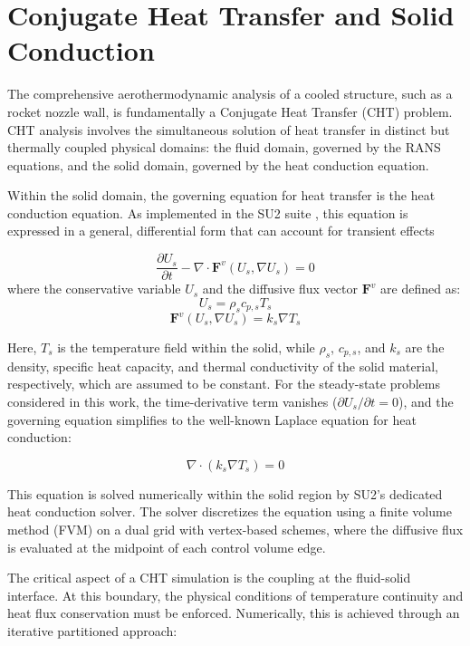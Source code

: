 \documentclass[tg, EN]{ufabcFHZh_tg}
\begin{document}
\section{Conjugate Heat Transfer and Solid Conduction}
\label{sec:cht_equations}

The comprehensive aerothermodynamic analysis of a cooled structure, such as a rocket nozzle wall, is fundamentally a Conjugate Heat Transfer (CHT) problem. CHT analysis involves the simultaneous solution of heat transfer in distinct but thermally coupled physical domains: the fluid domain, governed by the RANS equations, and the solid domain, governed by the heat conduction equation.

Within the solid domain, the governing equation for heat transfer is the heat conduction equation. As implemented in the SU2 suite \citep{su2_theory}, this equation is expressed in a general, differential form that can account for transient effects

\begin{equation}
\frac{\partial U_s}{\partial t} - \nabla \cdot \mathbf{F}^v(U_s, \nabla U_s) = 0
\label{eq:heat_conduction_transient}
\end{equation}
where the conservative variable $U_s$ and the diffusive flux vector $\mathbf{F}^v$ are defined as:
$$U_s = \rho_s c_{p,s} T_s$$
$$\mathbf{F}^v(U_s, \nabla U_s) = k_s \nabla T_s$$

Here, $T_s$ is the temperature field within the solid, while $\rho_s$, $c_{p,s}$, and $k_s$ are the density, specific heat capacity, and thermal conductivity of the solid material, respectively, which are assumed to be constant. For the steady-state problems considered in this work, the time-derivative term vanishes ($\partial U_s / \partial t = 0$), and the governing equation simplifies to the well-known Laplace equation for heat conduction:

\begin{equation}
\nabla \cdot (k_s \nabla T_s) = 0
\label{eq:heat_conduction_steady}
\end{equation}

This equation is solved numerically within the solid region by SU2's dedicated heat conduction solver. The solver discretizes the equation using a finite volume method (FVM) on a dual grid with vertex-based schemes, where the diffusive flux is evaluated at the midpoint of each control volume edge.

The critical aspect of a CHT simulation is the coupling at the fluid-solid interface. At this boundary, the physical conditions of temperature continuity and heat flux conservation must be enforced. Numerically, this is achieved through an iterative partitioned approach:
\end{document}
